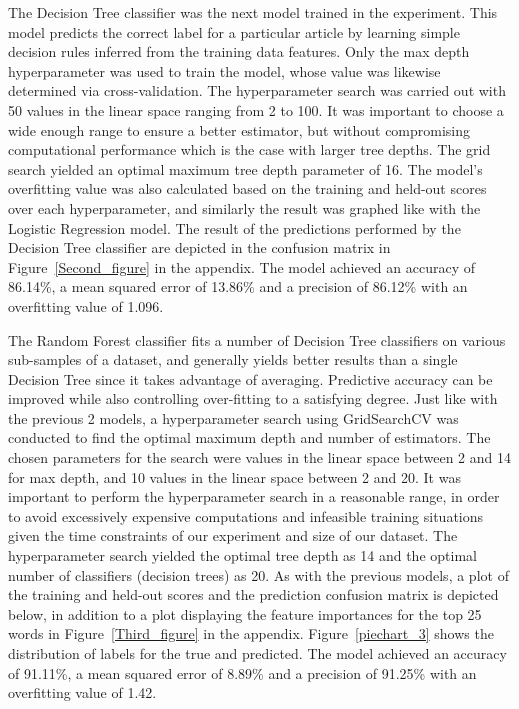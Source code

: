\documentclass[10pt,twocolumn,letterpaper]{article}
\begin{document}
The Decision Tree classifier was the next model trained in the experiment. This model predicts the correct label for a particular article by learning simple decision rules inferred from the training data features. Only the max depth hyperparameter was used to train the model, whose value was likewise determined via cross-validation. The hyperparameter search was carried out with 50 values in the linear space ranging from 2 to 100. It was important to choose a wide enough range to ensure a better estimator, but without compromising computational performance which is the case with larger tree depths. The grid search yielded an optimal maximum tree depth parameter of 16. The model's overfitting value was also calculated based on the training and held-out scores over each hyperparameter, and similarly the result was graphed like with the Logistic Regression model. The result of the predictions performed by the Decision Tree classifier are depicted in the confusion matrix in Figure~\ref{Second_figure} in the appendix. The model achieved an accuracy of 86.14\%, a mean squared error of 13.86\% and a precision of 86.12\% with an overfitting value of 1.096.\par

The Random Forest classifier fits a number of Decision Tree classifiers on various sub-samples of a dataset, and generally yields better results than a single Decision Tree since it takes advantage of averaging. Predictive accuracy can be improved while also controlling over-fitting to a satisfying degree. Just like with the previous 2 models, a hyperparameter search using GridSearchCV was conducted to find the optimal maximum depth and number of estimators. The chosen parameters for the search were values in the linear space between 2 and 14 for max depth, and 10 values in the linear space between 2 and 20. It was important to perform the hyperparameter search in a reasonable range, in order to avoid excessively expensive computations and infeasible training situations given the time constraints of our experiment and size of our dataset. The hyperparameter search yielded the optimal tree depth as 14 and the optimal number of classifiers (decision trees) as 20. As with the previous models, a plot of the training and held-out scores and the prediction confusion matrix is depicted below, in addition to a plot displaying the feature importances for the top 25 words in Figure~\ref{Third_figure} in the appendix. Figure~\ref{piechart_3} shows the distribution of labels for the true and predicted. The model achieved an accuracy of 91.11\%, a mean squared error of 8.89\% and a precision of 91.25\% with an overfitting value of 1.42.\par
\end{document}
